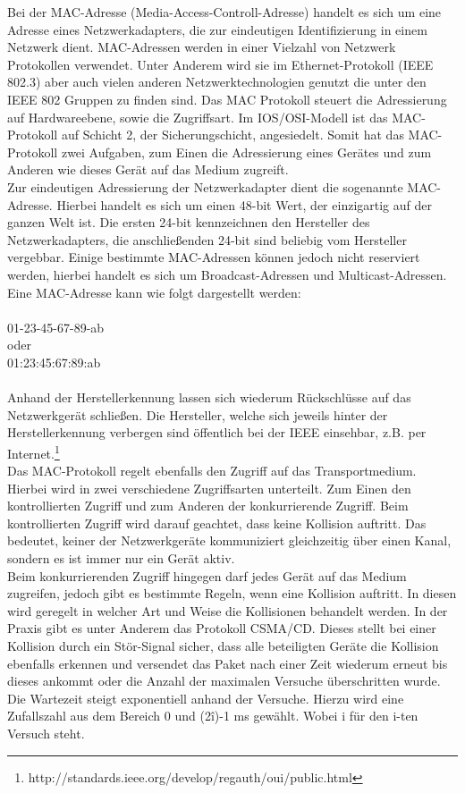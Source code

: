 Bei der MAC-Adresse (Media-Access-Controll-Adresse) handelt es sich um eine Adresse eines Netzwerkadapters, die zur eindeutigen Identifizierung in einem Netzwerk dient. MAC-Adressen werden in einer Vielzahl von Netzwerk Protokollen verwendet. Unter Anderem wird sie im Ethernet-Protokoll (IEEE 802.3)  aber auch vielen anderen Netzwerktechnologien genutzt die unter den IEEE 802 Gruppen zu finden sind.
Das MAC Protokoll steuert die Adressierung auf Hardwareebene, sowie die Zugriffsart.
Im IOS/OSI-Modell ist das MAC-Protokoll auf Schicht 2, der Sicherungschicht, angesiedelt.
Somit hat das MAC-Protokoll zwei Aufgaben, zum Einen die Adressierung eines Gerätes und zum Anderen wie dieses Gerät auf das Medium zugreift.\\
Zur eindeutigen Adressierung der Netzwerkadapter  dient die sogenannte MAC-Adresse. Hierbei handelt es sich um einen 48-bit Wert, der einzigartig auf der ganzen Welt ist. Die ersten 24-bit kennzeichnen den Hersteller des Netzwerkadapters, die anschließenden 24-bit sind beliebig vom Hersteller vergebbar. Einige bestimmte MAC-Adressen können jedoch nicht reserviert werden, hierbei handelt  es sich um Broadcast-Adressen und Multicast-Adressen.
Eine MAC-Adresse kann wie folgt dargestellt werden:\\
\\
01-23-45-67-89-ab\\
oder\\
01:23:45:67:89:ab\\
\\
Anhand der Herstellerkennung lassen sich wiederum Rückschlüsse auf das Netzwerkgerät schließen. Die Hersteller, welche sich jeweils hinter der Herstellerkennung verbergen sind öffentlich bei der IEEE einsehbar, z.B. per Internet.\footnote{http://standards.ieee.org/develop/regauth/oui/public.html}\\
Das MAC-Protokoll regelt ebenfalls den Zugriff auf das Transportmedium. Hierbei wird in zwei verschiedene Zugriffsarten unterteilt. Zum Einen den kontrollierten Zugriff und zum Anderen der konkurrierende Zugriff.
Beim kontrollierten Zugriff wird darauf geachtet, dass keine Kollision auftritt. Das bedeutet, keiner der Netzwerkgeräte kommuniziert gleichzeitig über einen Kanal, sondern es ist immer nur ein Gerät aktiv.\\
Beim konkurrierenden Zugriff hingegen darf jedes Gerät auf das Medium zugreifen, jedoch gibt es bestimmte Regeln, wenn eine Kollision auftritt. In diesen wird geregelt in welcher Art und Weise die Kollisionen behandelt werden. In der Praxis gibt es unter Anderem das Protokoll CSMA/CD. Dieses stellt bei einer Kollision durch ein Stör-Signal sicher, dass alle beteiligten Geräte die Kollision ebenfalls erkennen und versendet das Paket nach einer Zeit wiederum erneut bis dieses ankommt oder die Anzahl der maximalen Versuche überschritten wurde. Die Wartezeit steigt exponentiell anhand der Versuche.
Hierzu wird eine Zufallszahl aus dem Bereich 0 und (2\^i)-1 ms gewählt.
Wobei i für den i-ten Versuch steht.

